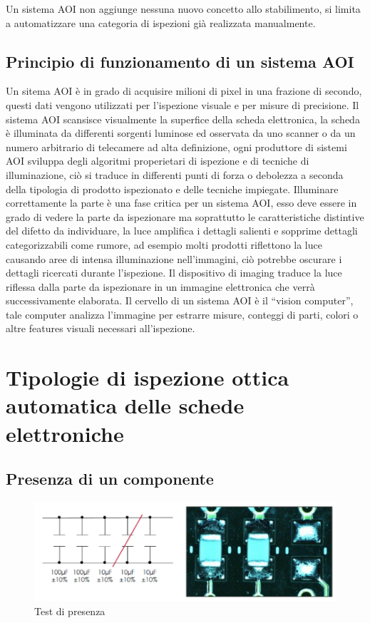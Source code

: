 Un sistema AOI non aggiunge nessuna nuovo concetto allo stabilimento, si limita a automatizzare una
categoria di ispezioni già realizzata manualmente.

\subsection {Principio di funzionamento di un sistema AOI}

Un sitema AOI è in grado di acquisire milioni di pixel in una frazione di secondo, questi dati vengono
utilizzati per l’ispezione visuale e per misure di precisione.
Il sistema AOI scansisce visualmente la superfice della scheda elettronica, la scheda è illuminata da
differenti sorgenti luminose ed osservata da uno scanner o da un numero arbitrario di telecamere ad alta
definizione, ogni produttore di sistemi AOI sviluppa degli algoritmi properietari di ispezione e di tecniche
di illuminazione, ciò si traduce in differenti punti di forza o debolezza a seconda della tipologia di
prodotto ispezionato e delle tecniche impiegate.
Illuminare correttamente la parte è una fase critica per un sistema AOI, esso deve essere in grado di
vedere la parte da ispezionare ma soprattutto le caratteristiche distintive del difetto da individuare, la luce amplifica i dettagli salienti e sopprime dettagli categorizzabili come rumore, ad esempio molti prodotti
riflettono la luce causando aree di intensa illuminazione nell’immagini, ciò potrebbe oscurare i dettagli
ricercati durante l’ispezione.
Il dispositivo di imaging traduce la luce riflessa dalla parte da ispezionare in un immagine elettronica che
verrà successivamente elaborata.
Il cervello di un sistema AOI è il “vision computer”, tale computer analizza l’immagine per estrarre misure,
conteggi di parti, colori o altre features visuali necessari all’ispezione.

\section {Tipologie di ispezione ottica automatica delle schede elettroniche}

\subsection{Presenza di un componente}

\begin{figure}[!ht]
\centering
\includegraphics[width=.8\textwidth]{img/presenza-componente.png}
\caption{Test di presenza}
\label{fig:presenza}
\end{figure}

